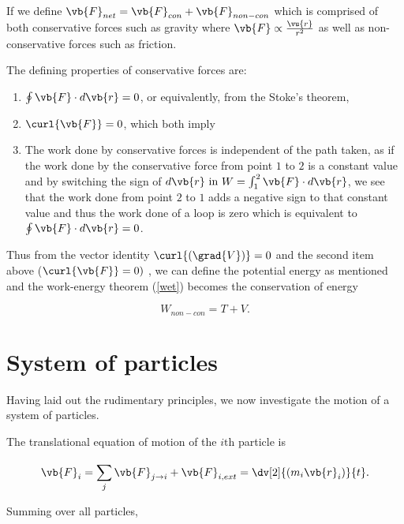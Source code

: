 \documentclass[a4paper,12pt]{report}
\begin{document}
If we define \(\vb{F} _{net} = \vb{F} _{con} + \vb{F} _{non-con} \) which is comprised of both conservative forces such as gravity where \(\vb{F} \propto \frac{\vu{r} }{r^2} \) as well as non-conservative forces such as friction.

The defining properties of conservative forces are:

\begin{enumerate}
	\item \(\oint \vb{F} \cdot d\vb{r} = 0\), or equivalently, from the Stoke's theorem,

	\item \(\curl{\vb{F} } = 0\), which both imply

	\item The work done by conservative forces is independent of the path taken, as if the work done by the conservative force from point \(1\) to \(2\) is a constant value and by switching the sign of \(d\vb{r} \text{ in } W = \int_{1}^{2} \vb{F} \cdot d\vb{r}  \), we see that the work done from point \(2\) to \(1\) adds a negative sign to that constant value and thus the work done of a loop is zero which is equivalent to \(\oint \vb{F} \cdot d\vb{r} =0\).
\end{enumerate}

Thus from the vector identity \(\curl{(\grad{V}) } = 0\) and the second item above (\(\curl{\vb{F} } =0)\) , we can define the potential energy as mentioned and the work-energy theorem (\cref{wet}) becomes the conservation of energy

\begin{equation}
	W_{non-con} = T + V. \label{con} 
\end{equation}




\section{System of particles}
Having laid out the rudimentary principles, we now investigate the motion of a system of particles.

The translational equation of motion of the \(i \text{th} \) particle is 

\begin{equation}
	\vb{F} _{i} = \sum_{j}^{} \vb{F} _{j \rightarrow i} + \vb{F} _{i, ext} = \dv[2]{(m_{i} \vb{r} _{i} )}{t}     .
\end{equation}
 
Summing over all particles,
\end{document}

